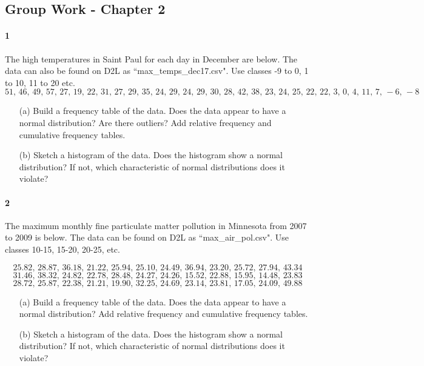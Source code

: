 \documentclass{article}
\begin{document}
\begin{flushleft}
\section*{Group Work - Chapter 2}
\paragraph{1} The high temperatures in Saint Paul for each day in December are below. The data can also be found on D2L as ``max\_temps\_dec17.csv". Use classes -9 to 0, 1 to 10, 11 to 20 etc. 
\[51 ,\, 46 ,\, 49 ,\, 57 ,\, 27 ,\, 19 ,\, 22 ,\, 31 ,\, 27 ,\, 29 ,\, 35 ,\, 24 ,\, 29 ,\, 24 ,\, 29 ,\, 30 ,\, 28 ,\, 42 ,\, 38 ,\, 23 ,\, 24 ,\, 25 ,\, 22 ,\, 22  ,\, 3  ,\, 0  ,\, 4 ,\, 11  ,\, 7 ,\, -6 ,\, -8\]
\begin{itemize}
\item [(a)] Build a frequency table of the data. Does the data appear to have a normal distribution? Are there outliers? Add relative frequency and cumulative frequency tables.
\vspace{3in}
\item[(b)] Sketch a histogram of the data. Does the histogram show a normal distribution? If not, which characteristic of normal distributions does it violate?
\end{itemize}



\newpage
\paragraph{2} The maximum monthly fine particulate matter pollution in Minnesota from 2007 to 2009 is below. The data can be found on D2L as ``max\_air\_pol.csv". Use classes 10-15, 15-20, 20-25, etc. 

\[  25.82 ,\,  28.87 ,\, 36.18 ,\, 21.22 ,\, 25.94 ,\, 25.10 ,\, 24.49 ,\, 36.94 ,\, 23.20 ,\, 25.72 ,\, 27.94 ,\, 43.34 \] 
\[31.46 ,\, 38.32 ,\, 24.82 ,\, 22.78 ,\, 28.48 ,\, 24.27 ,\, 24.26 ,\, 15.52 ,\, 22.88 ,\, 15.95 ,\, 14.48 ,\, 23.83 \]
\[ 28.72 ,\, 25.87 ,\, 22.38 ,\, 21.21 ,\, 19.90 ,\, 32.25 ,\, 24.69 ,\, 23.14 ,\, 23.81 ,\, 17.05 ,\, 24.09 ,\, 49.88 \]
\begin{itemize}
\item [(a)] Build a frequency table of the data. Does the data appear to have a normal distribution? Add relative frequency and cumulative frequency tables.
\vspace{3in}
\item[(b)] Sketch a histogram of the data. Does the histogram show a normal distribution? If not, which characteristic of normal distributions does it violate?
\end{itemize}



\end{flushleft}
\end{document}
